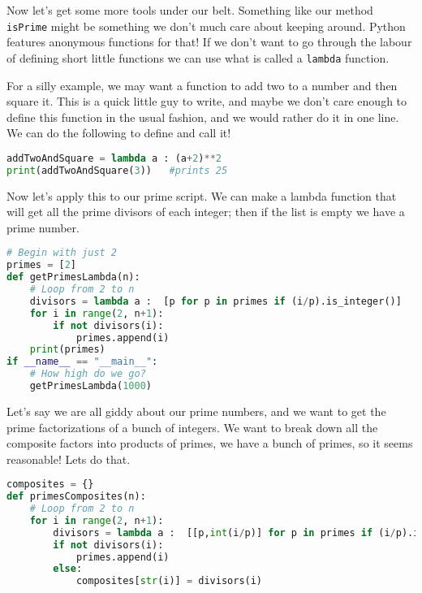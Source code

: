 \documentclass[11pt, twoside, reqno]{book}
\begin{document}
Now let's get some more tools under our belt. Something like our method \texttt{isPrime} might be something we don't much care about keeping around. Python features anonymous functions for that! If we don't want to go through the labour of defining short little functions we can use what is called a \texttt{lambda} function.

For a silly example, we may want a function to add two to a number and then square it. This is a quick little guy to write, and maybe we don't care enough to define this function in the usual fashion, and we would rather do it in one line. We can do the following to define and call it!
\begin{lstlisting}[language=Python]
addTwoAndSquare = lambda a : (a+2)**2
print(addTwoAndSquare(3))   #prints 25
\end{lstlisting}

Now let's apply this to our prime script. We can make a lambda function that will get all the prime divisors of each integer; then if the list is empty we have a prime number.
\begin{lstlisting}[language=Python]
# Begin with just 2
primes = [2]
def getPrimesLambda(n):
    # Loop from 2 to n
    divisors = lambda a :  [p for p in primes if (i/p).is_integer()]
    for i in range(2, n+1):
        if not divisors(i):
            primes.append(i)
    print(primes)
if __name__ == "__main__":
    # How high do we go?
    getPrimesLambda(1000)
\end{lstlisting}

Let's say we are all giddy about our prime numbers, and we want to get the prime factorizations of a bunch of integers. We want to break down all the composite factors into products of primes, we have a bunch of primes, so it seems reasonable! Lets do that.
\begin{lstlisting}[language=Python]
composites = {}
def primesComposites(n):
    # Loop from 2 to n
    for i in range(2, n+1):
        divisors = lambda a :  [[p,int(i/p)] for p in primes if (i/p).is_integer()]
        if not divisors(i):
            primes.append(i)
        else:
            composites[str(i)] = divisors(i)
\end{lstlisting}
\end{document}
